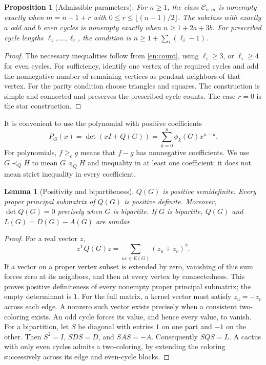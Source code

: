 \documentclass[12pt]{amsart}
\newtheorem{prop}[thm]{Proposition}
\newtheorem{lem}[thm]{Lemma}
\theoremstyle{definition}
\theoremstyle{remark}
\numberwithin{equation}{section}
\begin{document}
\begin{prop}[Admissible parameters]\label{en:range}
For $n\ge1$, the class $\mathcal C_{n,m}$ is nonempty exactly when
$m=n-1+r$ with $0\le r\le\lfloor(n-1)/2\rfloor$.
The subclass with exactly $a$ odd and $b$ even cycles is nonempty exactly when
$n\ge1+2a+3b$. For prescribed cycle lengths $\ell_1,\ldots,\ell_r$,
the condition is $n\ge1+\sum_i(\ell_i-1)$.
\end{prop}
\begin{proof}
The necessary inequalities follow from \eqref{en:count}, using
$\ell_i\ge3$, or $\ell_i\ge4$ for even cycles. For sufficiency, identify
one vertex of the required cycles and add the nonnegative number of
remaining vertices as pendant neighbors of that vertex. For the parity
condition choose triangles and squares. The construction is simple and
connected and preserves the prescribed cycle counts. The case $r=0$ is
the star construction.
\end{proof}

It is convenient to use the polynomial with positive coefficients
\begin{equation}\label{en:P}
 P_G(x)=\det(xI+Q(G))=\sum_{k=0}^n\phi_k(G)x^{n-k}.
\end{equation}
For polynomials, $f\ge_c g$ means that $f-g$ has nonnegative coefficients.
We use $G\prec_Q H$ to mean $G\preceq_Q H$ and inequality in at least
one coefficient; it does not mean strict inequality in every coefficient.

\begin{lem}[Positivity and bipartiteness]\label{en:positive}
$Q(G)$ is positive semidefinite. Every proper principal submatrix of
$Q(G)$ is positive definite. Moreover, $\det Q(G)=0$ precisely when $G$
is bipartite. If $G$ is bipartite, $Q(G)$ and $L(G)=D(G)-A(G)$ are similar.
\end{lem}
\begin{proof}
For a real vector $z$,
\[
 z^{\mathsf T}Q(G)z=\sum_{uv\in E(G)}(z_u+z_v)^2.
\]
If a vector on a proper vertex subset is extended by zero, vanishing of
this sum forces zero at its neighbors, and then at every vertex by
connectedness. This proves positive definiteness of every nonempty proper
principal submatrix; the empty determinant is $1$.
For the full matrix, a kernel vector must satisfy $z_u=-z_v$ across each
edge. A nonzero such vector exists precisely when a consistent two-coloring
exists. An odd cycle forces its value, and hence every value, to vanish.
For a bipartition, let $S$ be diagonal with entries $1$ on one part and
$-1$ on the other. Then $S^2=I$, $SDS=D$, and $SAS=-A$. Consequently
$SQS=L$. A cactus with only even cycles admits a two-coloring, by extending
the coloring successively across its edge and even-cycle blocks.
\end{proof}
\end{document}
